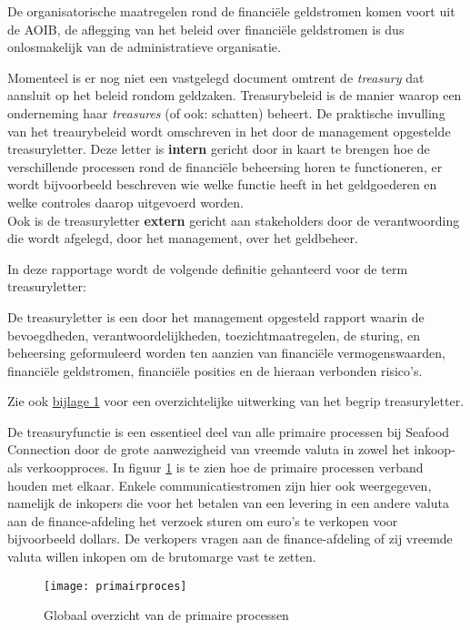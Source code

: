 De organisatorische maatregelen rond de financiële geldstromen komen voort uit de AOIB, de aflegging van het beleid over financiële geldstromen is dus onlosmakelijk van de administratieve organisatie. 

Momenteel is er nog niet een vastgelegd document omtrent de \textit{\gls{treasury}} dat aansluit op het beleid rondom geldzaken. Treasurybeleid is de manier waarop een onderneming haar \textit{treasures} (of ook: schatten) beheert. De praktische invulling van het treaurybeleid wordt omschreven in het door de management opgestelde \gls{treasuryletter}. 
Deze letter is \textbf{intern} gericht door in kaart te brengen hoe de verschillende processen rond de financiële beheersing horen te functioneren, er wordt bijvoorbeeld beschreven wie welke functie heeft in het \gls{geldgoederen} en welke controles daarop uitgevoerd worden. \\
Ook is de \gls{treasuryletter} \textbf{extern} gericht aan stakeholders door de verantwoording die wordt afgelegd, door het management, over het geldbeheer. \citep{jans}

In deze rapportage wordt de volgende definitie gehanteerd voor de term \gls{treasuryletter}: 

\begin{displayquote}
De \gls{treasuryletter} is een door het management opgesteld rapport waarin de bevoegdheden, verantwoordelijkheden, toezichtmaatregelen, de sturing, en beheersing geformuleerd worden ten aanzien van financiële vermogenswaarden, financiële geldstromen, financiële posities en de hieraan verbonden risico’s. \\
\citep{jans,buunk} \label{def:treasury}
\end{displayquote}
\noindent
Zie ook \hyperlink{bij:treasury}{bijlage 1} voor een overzichtelijke uitwerking van het begrip \gls{treasuryletter}.

De treasuryfunctie is een essentieel deel van alle primaire processen bij Seafood Connection door de grote aanwezigheid van vreemde valuta in zowel het inkoop- als verkoopproces. In figuur \ref{fig:primairproces} is te zien hoe de primaire processen verband houden met elkaar. Enkele communicatiestromen zijn hier ook weergegeven, namelijk de inkopers die voor het betalen van een levering in een andere valuta aan de finance-afdeling het verzoek sturen om euro's te verkopen voor bijvoorbeeld dollars. De verkopers vragen aan de finance-afdeling of zij vreemde valuta willen inkopen om de brutomarge vast te zetten.

\begin{figure}[!hb]
    \centering
    \texttt{[image: primairproces]}
    \caption{Globaal overzicht van de primaire processen}
    \label{fig:primairproces}
\end{figure}

